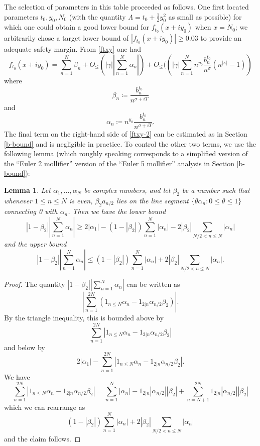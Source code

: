 \documentclass[a4paper,11pt,twoside]{amsart}
\newtheorem{lemma}[theorem]{Lemma}
\begin{document}
The selection of parameters in this table proceeded as follows.  One first located parameters $t_0, y_0, N_0$ (with the quantity $\Lambda = t_0 + \frac{1}{2} y_0^2$ as small as possible) for which one could obtain a good lower bound for $f_{t_0}(x+iy_0)$ when $x=N_0$; we arbitrarily chose a target lower bound of $|f_{t_0}(x+iy_0)| \geq 0.03$ to provide an adequate safety margin.  From \eqref{ftxy} one had
\begin{equation}\label{ftxy-2}
 f_{t_0}(x+iy_0) = \sum_{n=1}^N \beta_n + O_{\leq}( |\gamma| |\sum_{n=1}^N \alpha_n| ) + O_{\leq}(\left( |\gamma| \sum_{n=1}^N n^{y_0} \frac{b_n^{t_0}}{n^\sigma} (n^{|\kappa|}-1) \right)
\end{equation}
where
$$ \beta_n \coloneqq \frac{b_n^{t_0}}{n^{\sigma+iT}}$$
and
$$ \alpha_n \coloneqq n^{y_0} \frac{b_n^{t_0}}{n^{\sigma+iT}}.$$
The final term on the right-hand side of \eqref{ftxy-2} can be estimated as in Section \ref{b-bound} and is negligible in practice.  To control the other two terms, we use the following lemma (which roughly speaking corresponds to a simplified version of the ``Euler 2 mollifier'' version of the ``Euler 5 mollifier'' analysis in Section \ref{b-bound}):

\begin{lemma}\label{trib2}  Let $\alpha_1,\dots,\alpha_N$ be complex numbers, and let $\beta_2$ be a number such that whenever $1 \leq n \leq N$ is even, $\beta_2 a_{n/2}$ lies on the line segment $\{ \theta \alpha_n: 0 \leq \theta \leq 1\}$ connecting 0 with $\alpha_n$.  Then we have the lower bound
$$ |1-\beta_2| \left|\sum_{n=1}^N \alpha_n\right| \geq 2 |\alpha_1| - (1-|\beta_2|) \sum_{n=1}^N |\alpha_n| - 2 |\beta_2| \sum_{N/2 < n \leq N} |\alpha_n|$$
and the upper bound
$$ |1-\beta_2| \left|\sum_{n=1}^N \alpha_n\right| \leq (1-|\beta_2|) \sum_{n=1}^N |\alpha_n| + 2 |\beta_2| \sum_{N/2 < n \leq N} |\alpha_n|.$$
\end{lemma}

\begin{proof} The quantity $|1-\beta_2| |\sum_{n=1}^N \alpha_n|$ can be written as
$$ \left|\sum_{n=1}^{2N} (1_{n \leq N} \alpha_n - 1_{2|n} \alpha_{n/2} \beta_2)\right|.$$
By the triangle inequality, this is bounded above by
$$ \sum_{n=1}^{2N} |1_{n \leq N} \alpha_n - 1_{2|n} \alpha_{n/2} \beta_2|$$
and below by
$$ 2 |\alpha_1| - \sum_{n=1}^{2N} |1_{n \leq N} \alpha_n - 1_{2|n} \alpha_{n/2} \beta_2|.$$
We have
$$ \sum_{n=1}^{2N} |1_{n \leq N} \alpha_n - 1_{2|n} \alpha_{n/2} \beta_2| = \sum_{n=1}^N |\alpha_n| - 1_{2|n} |\alpha_{n/2}| |\beta_2| + \sum_{n=N+1}^{2N} 1_{2|n} |\alpha_{n/2}| |\beta_2|$$
which we can rearrange as
$$ (1 - |\beta_2|) \sum_{n=1}^N |\alpha_n| + 2 |\beta_2| \sum_{N/2 < n \leq N} |\alpha_n|$$
and the claim follows.
\end{proof}
\end{document}
